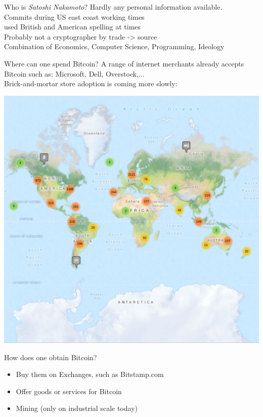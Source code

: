 \documentclass[12pt, usepdftitle=false]{beamer}
\begin{document}

\begin{frame}{Who is \emph{Satoshi Nakamoto}?}
	Hardly any personal information available.\\
	Commits during US east coast working times \\
	used British and American spelling at times \\
	Probably not a cryptographer by trade -> source \\
	Combination of Economics, Computer Science, Programming, Ideology
\end{frame}


\begin{frame}{Where can one spend Bitcoin?}
	A range of internet merchants already accepts Bitcoin such as: Microsoft, Dell, Overstock,...\\

	Brick-and-mortar store adoption is coming more slowly: 

	\centering
\includegraphics[width=.5\textwidth]{coinmap}
\end{frame}


\begin{frame}{How does one obtain Bitcoin?}
	\begin{itemize}
	\item Buy them on Exchanges, such as Bitstamp.com
	\item Offer goods or services for Bitcoin
	\item Mining (only on industrial scale today)
	\end{itemize}
\end{frame}
\end{document}
